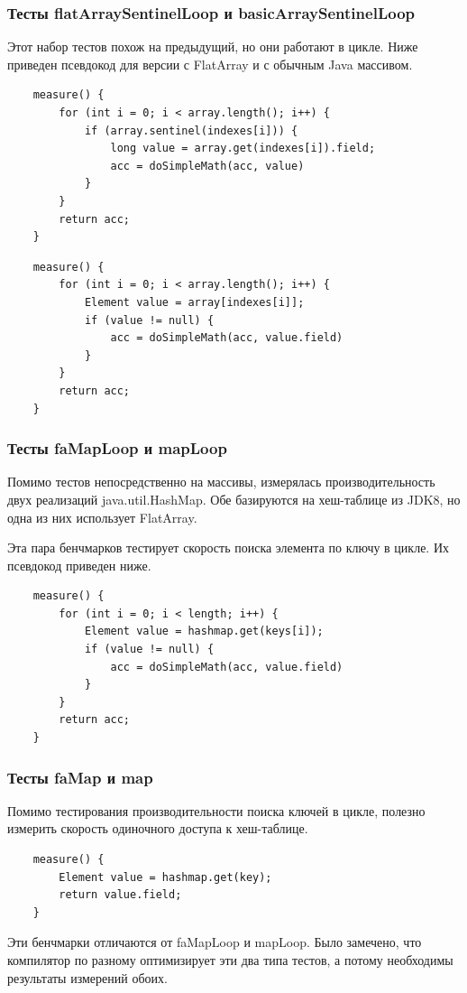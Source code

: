 \subsubsection{Тесты flatArraySentinelLoop и basicArraySentinelLoop}
Этот набор тестов похож на предыдущий, но они работают в цикле. Ниже приведен псевдокод для версии с FlatArray и с обычным Java массивом.
\begin{lstlisting}
	measure() {
		for (int i = 0; i < array.length(); i++) {
			if (array.sentinel(indexes[i])) {
				long value = array.get(indexes[i]).field;
				acc = doSimpleMath(acc, value)
			}
		}
		return acc;
	}
\end{lstlisting}

\begin{lstlisting}
	measure() {
		for (int i = 0; i < array.length(); i++) {
			Element value = array[indexes[i]];
			if (value != null) {
				acc = doSimpleMath(acc, value.field)
			}
		}
		return acc;
	}
\end{lstlisting}

\subsubsection{Тесты faMapLoop и mapLoop}
Помимо тестов непосредственно на массивы, измерялась производительность двух реализаций java.util.HashMap. 
Обе базируются на хеш-таблице из JDK8, но одна из них использует FlatArray. 
\par
Эта пара бенчмарков тестирует скорость поиска элемента по ключу в цикле. Их псевдокод приведен ниже.
\begin{lstlisting}
	measure() {
		for (int i = 0; i < length; i++) {
			Element value = hashmap.get(keys[i]);
			if (value != null) {
				acc = doSimpleMath(acc, value.field)
			}
		}
		return acc;
	}
\end{lstlisting}

\subsubsection{Тесты faMap и map}
Помимо тестирования производительности поиска ключей в цикле, полезно измерить скорость одиночного доступа к хеш-таблице.
\begin{lstlisting}
	measure() {
		Element value = hashmap.get(key);
		return value.field;
	}
\end{lstlisting}
Эти бенчмарки отличаются от faMapLoop и mapLoop. Было замечено, что компилятор по разному оптимизирует эти два типа тестов, а потому необходимы результаты измерений обоих. 

\clearpage